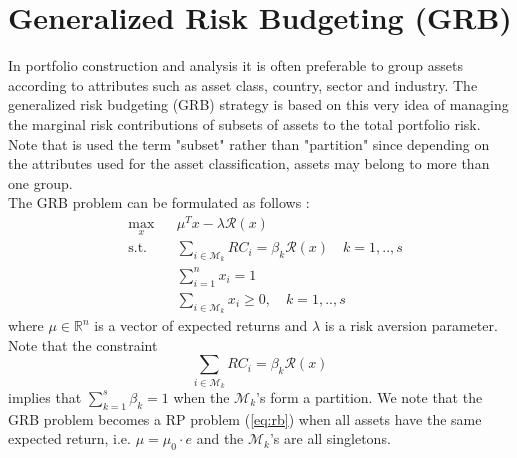 \section{Generalized Risk Budgeting (GRB)}
In portfolio construction and analysis it is often preferable to group assets according to attributes such as asset class, country, sector and industry. The generalized risk budgeting (GRB) strategy is based on this very idea of managing the marginal risk contributions of subsets of assets to the total portfolio risk. Note that is used the term "subset" rather than "partition" since depending on the attributes used for the asset classification, assets may belong to more than one group.\\
The GRB problem can be formulated as follows \cite{sdp}:
\begin{equation}
\begin{aligned}
& \underset{x}{\text{max}}
&& \mu^Tx - \lambda\mathcal{R}(x)\\
& \text{s.t.}
&&\sum_{i \in \mathcal{M}_k} RC_i = \beta_k \mathcal{R}(x) \quad k=1,..,s\\
&&&\sum_{i=1}^n x_i = 1\\
&&&\sum_{i \in \mathcal{M}_k} x_i \geq 0, \quad k=1,..,s
\end{aligned}
\end{equation}
where $\mu \in \mathbb{R}^n$ is a vector of expected returns and $\lambda$ is a risk aversion parameter. Note that the constraint
\begin{equation}
\sum_{i \in \mathcal{M}_k} RC_i = \beta_k \mathcal{R}(x)
\end{equation}
implies that $\sum_{k=1}^s \beta_k =1$ when the $\mathcal{M}_k$'s form a partition. We note that the GRB problem becomes a RP problem (\ref{eq:rb}) when all assets have the same expected return, i.e. $\mu = \mu_0 \cdot e$ and the $\mathcal{M}_k$'s are all singletons.